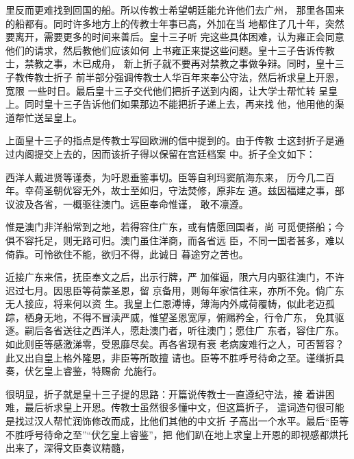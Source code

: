里反而更难找到回国的船。所以传教士希望朝廷能允许他们去广州，%
那里各国来的船都有。同时许多地方上的传教士年事已高，外加在当%
地都住了几十年，突然要离开，需要更多的时间来善后。皇十三子听%
完这些具体困难，认为雍正会同意他们的请求，然后教他们应该如何%
上书雍正来提这些问题。皇十三子告诉传教士，禁教之事，木已成舟，%
新上折子就不要再对禁教之事做争辩。同时，皇十三子教传教士折子%
前半部分强调传教士人华百年来奉公守法，然后祈求皇上开恩，宽限%
一些时日。最后皇十三子交代他们把折子送到内阁，让大学士帮忙转%
呈皇上。同时皇十三子告诉他们如果那边不能把折子递上去，再来找%
他，他用他的渠道帮忙送呈皇上。%
\par
上面皇十三子的指点是传教士写回欧洲的信中提到的。由于传教%
士这封折子是通过内阁提交上去的，因而该折子得以保留在宫廷档案%
中。折子全文如下：%
\par
{\bookkai 西洋人戴进贤等谨奏，为吁恩垂鉴事切。臣等自利玛窦航海东来，}%
{\bookkai 历今几二百年。幸荷圣朝优容无外，故士至如归，守法焚修，原非左}%
{\bookkai 道。兹因福建之事，部议波及各省，一概驱往澳门。远臣奉命惟谨，}%
{\bookkai 敢不凛遵。}%
\par
{\bookkai 惟是澳门非洋船常到之地，若得容住广东，或有情愿回国者，尚}%
{\bookkai 可觅便搭船；今俱不容托足，则无路可归。澳门虽住洋商，而各省远}%
{\bookkai 臣，不同一国者甚多，难以倚靠。可怜欲住不能，欲归不得，此诚日}%
{\bookkai 暮途穷之苦也。}%
\par
{\bookkai 近接广东来信，抚臣奉文之后，出示行牌，严}%
{\bookkai 加催逼，限六月内驱往澳门，不许迟过七月。因思臣等荷蒙圣恩，留}%
{\bookkai 京备用，则每年家信往来，亦所不免。倘广东无人接应，将来何以资}%
{\bookkai 生。我皇上仁恩溥博，薄海内外咸荷覆帱，似此老迈孤}%
{\bookkai 踪，栖身无地，不得不冒渎严威，惟望圣恩宽厚，俯赐矜全，行令广东，}%
{\bookkai 免其驱逐。嗣后各省送往之西洋人，愿赴澳门者，听往澳门；愿住广}%
{\bookkai 东者，容住广东。如此则臣等感激涕零，受恩靡尽矣。再各省现有衰}%
{\bookkai 老病废难行之人，可否暂容？此又出自皇上格外隆恩，非臣等所敢擅}%
{\bookkai 请也。臣等不胜呼号待命之至。谨缮折具奏，伏乞皇上睿鉴，特赐俞}%
{\bookkai 允施行。}%
\par
很明显，折子就是皇十三子提的思路：开篇说传教士一直遵纪守法，接%
着讲困难，最后祈求皇上开恩。传教士虽然很多懂中文，但这篇折子，%
遣词造句很可能是找过汉人帮忙润饰修改而成，比他们其他的中文折%
子高出一个水平。最后“臣等不胜呼号待命之至”“伏乞皇上睿鉴”，把%
他们趴在地上求皇上开恩的即视感都烘托出来了，深得文臣奏议精髓，%
